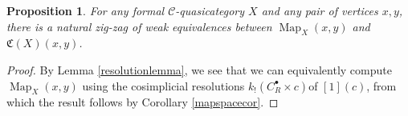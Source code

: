 \documentclass[leqno]{article}
\numberwithin{equation}{subsection}
\theoremstyle{plain}   %
\newtheorem{prop}[equation]{Proposition}
\theoremstyle{remark}
\theoremstyle{plain}
\newcommand{\overcat}[2]{{\left(#1\downarrow #2\right)}}
\DeclareMathOperator{\Map}{Map}
\renewcommand{\C}{\ensuremath{\mathcal{C}}}
\newcommand{\cellset}{\ensuremath{\widehat{\Theta[\mathcal{C}]}}}
\begin{document}
\begin{comment}
		The righthand vertical map comes from applying the nerve to the functor
		\[f:\overcat{\Delta}{\cellset_{\ast,\ast}(R^\bullet(c),X_{x,y})} \to \overcat{\mathcal{Y}_f(c)}{X_{x,y}}\]
		defined by the rule
		\[([n],R^n(c) \to X_{x,y}) \mapsto (R^n(c), R^n(c)\to X_{x,y}).\]
		To show that this functor induces a weak equivalence on nerves, we apply Quillen's theorem A.  Notice that for an object \	(y=(Y(c),Y(c)\to X_{x,y})\), the comma category \(\overcat{f}{y}\) is precisely
		\[\overcat{\Delta}{\mathcal{G}(c)(R^\bullet(c),Y(c))}=\overcat{\Delta}{\Map^\mathbf{sp}_{Y(c)}(\alpha,\omega)}.\]
		But by \cite{ds2}, the nerve of the category of elements of a simplicial set is weakly equivalent to that simplicial set, 	and since \(\Map^\mathbf{sp}_{Y(c)}(\alpha,\omega)\) was assumed to be contractible, the result follows.

		To see that the bottom map is an equivalence, it follows simply because \(C^\bullet(c) \to R^\bullet(c)\) is a Reedy 	trivial cofibration, so
		\[\cellset_{\ast,\ast}(R^\bullet(c),X_{x,y})  \to \cellset_{\ast,\ast}(C^\bullet(c),X_{x,y})\]
		is a weak equivalence.  Therefore, again by \cite{ds2}, the nerve of the category of elements of simplicial sets 	preserves weak equivalences.
	\end{proof}
\end{comment}
\begin{prop}\label{mapspacecomparison}
  For any formal \(\C\)-quasicategory \(X\) and any pair of vertices \(x,y\), there is a natural zig-zag of weak equivalences between \(\Map_X(x,y)\) and \(\mathfrak{C}(X)(x,y)\).
\end{prop}
\begin{proof}
	By Lemma \ref{resolutionlemma}, we see that we can equivalently compute \(\Map_X(x,y)\) using the cosimplicial resolutions \(k_!(C^\bullet_R\times c)\)of \([1](c)\), from which the result follows by Corollary \ref{mapspacecor}.
\end{proof}
\end{document}
